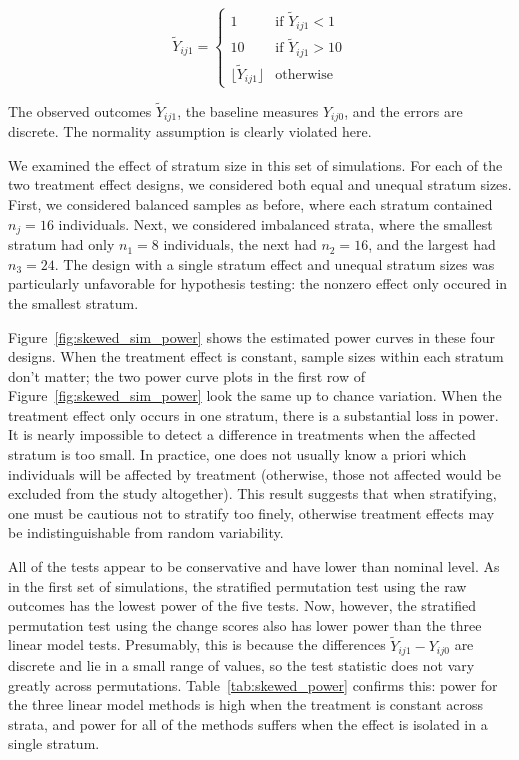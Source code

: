 \documentclass[12pt]{article}
\begin{document}
\begin{displaymath}
   \tilde{Y}_{ij1} = \left\{
     \begin{array}{ll}
       1 & \text{if } \tilde{Y}_{ij1} < 1\\
       10 & \text{if } \tilde{Y}_{ij1} > 10 \\
       \lfloor \tilde{Y}_{ij1} \rfloor & \text{otherwise}
     \end{array}
   \right.
\end{displaymath}

The observed outcomes $\tilde{Y}_{ij1}$, the baseline measures $Y_{ij0}$, and the errors are discrete.
The normality assumption is clearly violated here.

We examined the effect of stratum size in this set of simulations.
For each of the two treatment effect designs, we considered both equal and unequal stratum sizes.
First, we considered balanced samples as before, where each stratum contained $n_j = 16$ individuals.
Next, we considered imbalanced strata, where the smallest stratum had only $n_1=8$ individuals, the next had $n_2= 16$, and the largest had $n_3=24$.
The design with a single stratum effect and unequal stratum sizes was particularly unfavorable for hypothesis testing:
the nonzero effect only occured in the smallest stratum.

Figure~\ref{fig:skewed_sim_power} shows the estimated power curves in these four designs.
When the treatment effect is constant, sample sizes within each stratum don't matter; 
the two power curve plots in the first row of Figure~\ref{fig:skewed_sim_power} look the same up to chance variation.
When the treatment effect only occurs in one stratum, there is a substantial loss in power.
It is nearly impossible to detect a difference in treatments when the affected stratum is too small.
In practice, one does not usually know a priori which individuals will be affected by treatment (otherwise, those not affected would be excluded from the study altogether).
This result suggests that when stratifying, one must be cautious not to stratify too finely, otherwise treatment effects may be indistinguishable from random variability.

All of the tests appear to be conservative and have lower than nominal level.
As in the first set of simulations, the stratified permutation test using the raw outcomes has the lowest power of the five tests.
Now, however, the stratified permutation test using the change scores also has lower power than the three linear model tests.
Presumably, this is because the differences $\tilde{Y}_{ij1} - Y_{ij0}$ are discrete and lie in a small range of values, so the test statistic does not vary greatly across permutations.
Table~\ref{tab:skewed_power} confirms this: power for the three linear model methods is high when the treatment is constant across strata, and power for all of the methods suffers when the effect is isolated in a single stratum.
\end{document}
